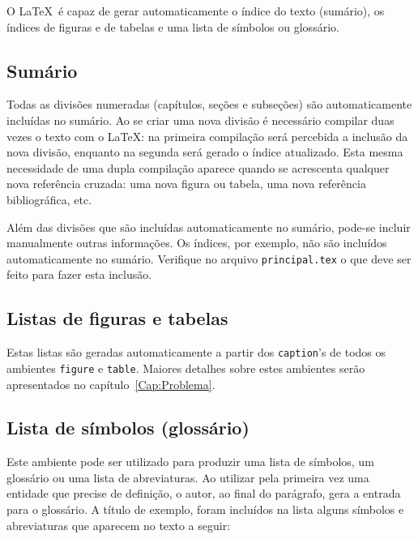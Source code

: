 O \LaTeX\ é capaz de gerar automaticamente o índice do texto
(sumário), os índices de figuras e de tabelas e uma lista de símbolos
ou glossário.

\subsection{Sumário}
\label{Sec:sumario}

Todas as divisões numeradas (capítulos, seções e subseções) são
automaticamente incluídas no sumário. Ao se criar uma nova divisão é
necessário compilar duas vezes o texto com o \LaTeX: na primeira
compilação será percebida a inclusão da nova divisão, enquanto na
segunda será gerado o índice atualizado. Esta mesma necessidade de uma
dupla compilação aparece quando se acrescenta qualquer nova referência
cruzada: uma nova figura ou tabela, uma nova referência bibliográfica,
etc.

Além das divisões que são incluídas automaticamente no sumário, pode-se
incluir manualmente outras informações. Os índices, por exemplo, não
são incluídos automaticamente no sumário. Verifique no arquivo
\texttt{principal.tex} o que deve ser feito para fazer esta inclusão.

\subsection{Listas de figuras e tabelas}
\label{Sec:listasfigtab}

Estas listas são geradas automaticamente a partir dos
\texttt{caption}'s de todos os ambientes \texttt{figure} e
\texttt{table}. Maiores detalhes sobre estes ambientes serão apresentados
no capítulo~\ref{Cap:Problema}.

\subsection{Lista de símbolos (glossário)}
\label{Sec:glossario}

Este ambiente pode ser utilizado para produzir uma lista de símbolos,
um glossário ou uma lista de abreviaturas. Ao utilizar pela primeira
vez uma entidade que precise de definição, o autor, ao final do
parágrafo, gera a entrada para o glossário. A título de exemplo,
foram incluídos na lista alguns símbolos e abreviaturas que aparecem
no texto a seguir:

